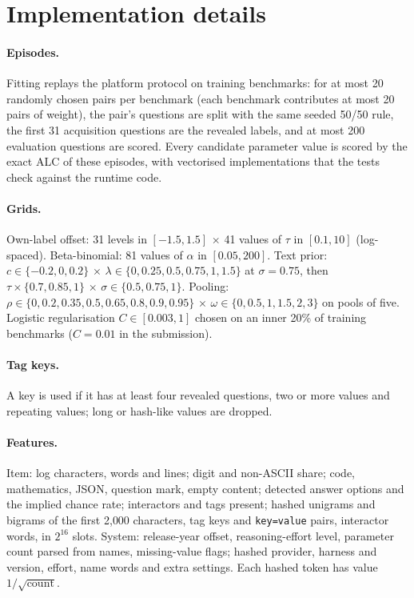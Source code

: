 \documentclass{article}
\newcommand{\code}[1]{\texttt{#1}}
\begin{document}
\section{Implementation details}
\label{app:details}

\paragraph{Episodes.} Fitting replays the platform protocol on training benchmarks: for at most 20 randomly chosen pairs per benchmark (each benchmark contributes at most 20 pairs of weight), the pair's questions are split with the same seeded 50/50 rule, the first 31 acquisition questions are the revealed labels, and at most 200 evaluation questions are scored. Every candidate parameter value is scored by the exact ALC of these episodes, with vectorised implementations that the tests check against the runtime code.

\paragraph{Grids.} Own-label offset: 31 levels in $[-1.5, 1.5]$ $\times$ 41 values of $\tau$ in $[0.1, 10]$ (log-spaced). Beta-binomial: 81 values of $\alpha$ in $[0.05, 200]$. Text prior: $c \in \{-0.2, 0, 0.2\}$ $\times$ $\lambda \in \{0, 0.25, 0.5, 0.75, 1, 1.5\}$ at $\sigma = 0.75$, then $\tau \times \{0.7, 0.85, 1\}$ $\times$ $\sigma \in \{0.5, 0.75, 1\}$. Pooling: $\rho \in \{0, 0.2, 0.35, 0.5, 0.65, 0.8, 0.9, 0.95\}$ $\times$ $\omega \in \{0, 0.5, 1, 1.5, 2, 3\}$ on pools of five. Logistic regularisation $C \in [0.003, 1]$ chosen on an inner 20\% of training benchmarks ($C = 0.01$ in the submission).

\paragraph{Tag keys.} A key is used if it has at least four revealed questions, two or more values and repeating values; long or hash-like values are dropped.

\paragraph{Features.} Item: log characters, words and lines; digit and non-ASCII share; code, mathematics, JSON, question mark, empty content; detected answer options and the implied chance rate; interactors and tags present; hashed unigrams and bigrams of the first 2{,}000 characters, tag keys and \code{key=value} pairs, interactor words, in $2^{16}$ slots. System: release-year offset, reasoning-effort level, parameter count parsed from names, missing-value flags; hashed provider, harness and version, effort, name words and extra settings. Each hashed token has value $1/\sqrt{\text{count}}$.
\end{document}
